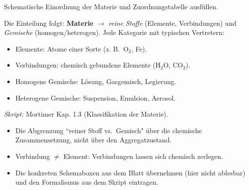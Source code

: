 

Schematische Einordnung der Materie und Zuordnungstabelle ausfüllen.

\begin{werkzeugkasten}
Die Einteilung folgt: \textbf{Materie} $\rightarrow$ \emph{reine Stoffe} (Elemente,
Verbindungen) und \emph{Gemische} (homogen/heterogen). Jede Kategorie mit
typischen Vertretern:
\begin{itemize}
  \item Elemente: Atome einer Sorte (z. B.\ O$_2$, Fe).
  \item Verbindungen: chemisch gebundene Elemente (H$_2$O, CO$_2$).
  \item Homogene Gemische: Lösung, Gasgemisch, Legierung.
  \item Heterogene Gemische: Suspension, Emulsion, Aerosol.
\end{itemize}
\textit{Skript:} Mortimer Kap. 1.3 (Klassifikation der Materie).
\end{werkzeugkasten}

\begin{achtung}
\begin{itemize}
  \item Die Abgrenzung ``reiner Stoff vs.\ Gemisch" über die chemische
        Zusammensetzung, nicht über den Aggregatzustand.
  \item Verbindung $\neq$ Element: Verbindungen lassen sich chemisch zerlegen.
  \item Die konkreten Schemaboxen aus dem Blatt übernehmen (hier nicht
        ablesbar) und den Formalismus aus dem Skript eintragen.
\end{itemize}
\end{achtung}
